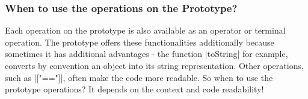 \subsubsection{When to use the operations on the Prototype?} %
\label{subsub:When to use the operations on the prototype?}
Each operation on the prototype is also available as an operator or terminal
operation. The prototype offers these functionalities additionally because
sometimes it has additional advantages - the function |toString| for example,
converts by convention an object into its string representation. Other
operations, such as |["=="]|, often make the code more readable. So when to use
the prototype operations? It depends on the context and code readability!



